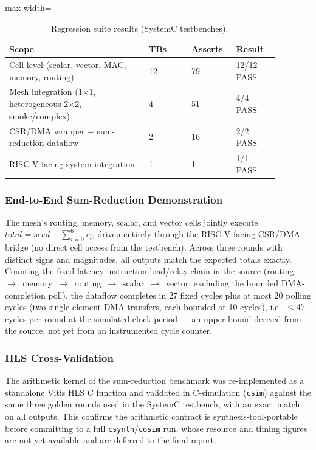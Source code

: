 \documentclass[conference]{IEEEtran}
\begin{document}
\begin{table}[htbp]
\centering
\caption{Regression suite results (SystemC testbenches).}
\label{tab:test_results}
\scriptsize
\begin{adjustbox}{max width=\columnwidth}
\begin{tabular}{@{}p{0.46\linewidth}p{0.14\linewidth}p{0.14\linewidth}p{0.14\linewidth}@{}}
\toprule
\textbf{Scope} & \textbf{TBs} & \textbf{Asserts} & \textbf{Result} \\
\midrule
Cell-level (scalar, vector, MAC, memory, routing) & 12 & 79 & 12/12 PASS \\
Mesh integration (1$\times$1, heterogeneous 2$\times$2, smoke/complex) & 4 & 51 & 4/4 PASS \\
CSR/DMA wrapper + sum-reduction dataflow & 2 & 16 & 2/2 PASS \\
RISC-V-facing system integration & 1 & 1 & 1/1 PASS \\
\bottomrule
\end{tabular}
\end{adjustbox}
\end{table}

\subsubsection{End-to-End Sum-Reduction Demonstration}
The mesh's routing, memory, scalar, and vector cells jointly execute $total = seed + \sum_{i=0}^{6} v_i$, driven entirely through the RISC-V-facing CSR/DMA bridge (no direct cell access from the testbench). Across three rounds with distinct signs and magnitudes, all outputs match the expected totals exactly. Counting the fixed-latency instruction-load/relay chain in the source (routing~$\to$~memory~$\to$~routing~$\to$~scalar~$\to$~vector, excluding the bounded DMA-completion poll), the dataflow completes in 27 fixed cycles plus at most 20 polling cycles (two single-element DMA transfers, each bounded at 10 cycles), i.e.\ $\leq$47 cycles per round at the simulated clock period --- an upper bound derived from the source, not yet from an instrumented cycle counter.

\subsubsection{HLS Cross-Validation}
The arithmetic kernel of the sum-reduction benchmark was re-implemented as a standalone Vitis HLS C function and validated in C-simulation (\texttt{csim}) against the same three golden rounds used in the SystemC testbench, with an exact match on all outputs. This confirms the arithmetic contract is synthesis-tool-portable before committing to a full \texttt{csynth}/\texttt{cosim} run, whose resource and timing figures are not yet available and are deferred to the final report.
\end{document}
